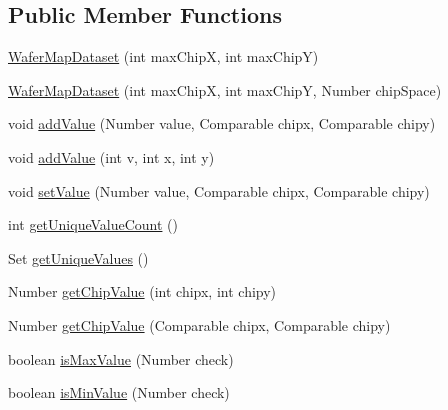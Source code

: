 \subsection*{Public Member Functions}
\begin{DoxyCompactItemize}
\item 
\mbox{\hyperlink{classorg_1_1jfree_1_1data_1_1general_1_1_wafer_map_dataset_a786393bc7ad90f79d5a7fda3522aaaad}{Wafer\+Map\+Dataset}} (int max\+ChipX, int max\+ChipY)
\item 
\mbox{\hyperlink{classorg_1_1jfree_1_1data_1_1general_1_1_wafer_map_dataset_a97a530d3f5a8722dfb72b621fa99ec99}{Wafer\+Map\+Dataset}} (int max\+ChipX, int max\+ChipY, Number chip\+Space)
\item 
void \mbox{\hyperlink{classorg_1_1jfree_1_1data_1_1general_1_1_wafer_map_dataset_a681224022c72472258ad82032c05c260}{add\+Value}} (Number value, Comparable chipx, Comparable chipy)
\item 
void \mbox{\hyperlink{classorg_1_1jfree_1_1data_1_1general_1_1_wafer_map_dataset_a0f6e261b5c0e6f914152cce10a9b0710}{add\+Value}} (int v, int x, int y)
\item 
void \mbox{\hyperlink{classorg_1_1jfree_1_1data_1_1general_1_1_wafer_map_dataset_ad66456268319949d4726074e1758a130}{set\+Value}} (Number value, Comparable chipx, Comparable chipy)
\item 
int \mbox{\hyperlink{classorg_1_1jfree_1_1data_1_1general_1_1_wafer_map_dataset_a7a39c03fe20de53e74602b20ad71ee0b}{get\+Unique\+Value\+Count}} ()
\item 
Set \mbox{\hyperlink{classorg_1_1jfree_1_1data_1_1general_1_1_wafer_map_dataset_a4b8a1371f930ce7875852f04bb817341}{get\+Unique\+Values}} ()
\item 
Number \mbox{\hyperlink{classorg_1_1jfree_1_1data_1_1general_1_1_wafer_map_dataset_adea33d23ec8d4055fd3a9044d9c9624e}{get\+Chip\+Value}} (int chipx, int chipy)
\item 
Number \mbox{\hyperlink{classorg_1_1jfree_1_1data_1_1general_1_1_wafer_map_dataset_a981dd6049bcf89fe865f81eb4beb5134}{get\+Chip\+Value}} (Comparable chipx, Comparable chipy)
\item 
boolean \mbox{\hyperlink{classorg_1_1jfree_1_1data_1_1general_1_1_wafer_map_dataset_a05628f2f0867b3a38b72014c9c3625b4}{is\+Max\+Value}} (Number check)
\item 
boolean \mbox{\hyperlink{classorg_1_1jfree_1_1data_1_1general_1_1_wafer_map_dataset_ab0a7bac9f4c588cdf88254a973d92fd4}{is\+Min\+Value}} (Number check)
\item 

\end{DoxyCompactItemize}

